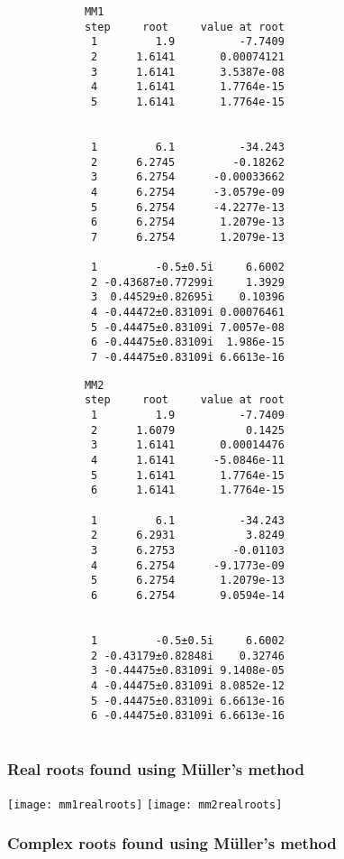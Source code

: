 \documentclass{article}
\begin{document}
	\begin{multicols}{2}
		\begin{verbatim}
			MM1
			step     root     value at root
			 1         1.9          -7.7409
			 2      1.6141       0.00074121
			 3      1.6141       3.5387e-08
			 4      1.6141       1.7764e-15
			 5      1.6141       1.7764e-15
			 
			 
			 1         6.1          -34.243
			 2      6.2745         -0.18262
			 3      6.2754      -0.00033662
			 4      6.2754      -3.0579e-09
			 5      6.2754      -4.2277e-13
			 6      6.2754       1.2079e-13
			 7      6.2754       1.2079e-13
			 
			 1         -0.5±0.5i     6.6002
			 2 -0.43687±0.77299i     1.3929
			 3  0.44529±0.82695i    0.10396
			 4 -0.44472±0.83109i 0.00076461
			 5 -0.44475±0.83109i 7.0057e-08
			 6 -0.44475±0.83109i  1.986e-15
			 7 -0.44475±0.83109i 6.6613e-16
		\end{verbatim}
		\begin{verbatim}
			MM2
			step     root     value at root
			 1         1.9          -7.7409
			 2      1.6079           0.1425
			 3      1.6141       0.00014476
			 4      1.6141      -5.0846e-11
			 5      1.6141       1.7764e-15
			 6      1.6141       1.7764e-15
			 
			 1         6.1          -34.243
			 2      6.2931           3.8249
			 3      6.2753         -0.01103
			 4      6.2754      -9.1773e-09
			 5      6.2754       1.2079e-13
			 6      6.2754       9.0594e-14
			 
			 
			 1         -0.5±0.5i     6.6002
			 2 -0.43179±0.82848i    0.32746
			 3 -0.44475±0.83109i 9.1408e-05
			 4 -0.44475±0.83109i 8.0852e-12
			 5 -0.44475±0.83109i 6.6613e-16
			 6 -0.44475±0.83109i 6.6613e-16
			 
		\end{verbatim}
	\end{multicols}
	
	\subsubsection{Real roots found using M{\"u}ller's method}
	
	\texttt{[image: mm1realroots]}
	\texttt{[image: mm2realroots]}
	
	\subsubsection{Complex roots found using M{\"u}ller's method}
	
\end{document}
